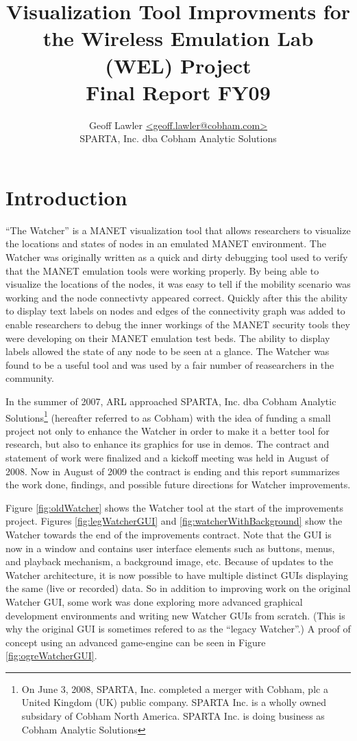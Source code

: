 \documentclass{report}
\author{Geoff Lawler \url{<geoff.lawler@cobham.com>} \\ SPARTA, Inc. dba Cobham Analytic Solutions}
\title{{\bf Visualization Tool Improvments for the Wireless Emulation Lab (WEL) Project}\\Final Report FY09}
\begin{document}
\maketitle

\renewcommand*\thesection{\arabic{section}}

\section{Introduction}

``The Watcher'' is a MANET visualization tool that allows researchers to visualize the locations and states of nodes in an emulated MANET environment. The Watcher was originally written 
as a quick and dirty debugging tool used to verify that the MANET emulation tools were working properly. By being able to visualize the locations of the nodes, it was easy to 
tell if the mobility scenario was working and the node connectivty appeared correct. Quickly after this the ability to display text labels on nodes and edges of the connectivity 
graph was added to enable researchers to debug the inner workings of the MANET security tools they were developing on their MANET emulation test beds. The ability to display labels
allowed the state of any node to be seen at a glance. The Watcher was found to be a useful tool and was used by a fair number of reasearchers in the community. 

In the summer of 2007, ARL approached SPARTA, Inc. dba Cobham Analytic Solutions\footnote{On June 3, 2008, SPARTA, Inc. completed a merger with Cobham, plc a United Kingdom (UK) 
public company. SPARTA Inc. is a wholly owned subsidary of Cobham North America. SPARTA Inc. is doing business as Cobham Analytic Solutions}
(hereafter referred to as Cobham) with the idea of funding a small project not only to enhance the Watcher in order to make it a better tool for research, but also to enhance 
its graphics for use in demos. The contract and statement of work were finalized and a kickoff meeting was held in August of 2008. Now in August of 2009 the contract is ending and 
this report summarizes the work done, findings, and possible future directions for Watcher improvements. 

Figure \ref{fig:oldWatcher} shows the Watcher tool at the start of the improvements project. Figures \ref{fig:legWatcherGUI} and \ref{fig:watcherWithBackground}
show the Watcher towards the end of the improvements contract. Note that the GUI is now in a window and contains user interface elements such as buttons, menus, and playback
mechanism, a background image, etc. Because of updates to the Watcher architecture, it is now possible to have multiple distinct GUIs displaying the same (live or recorded) data. So in addition to improving
work on the original Watcher GUI, some work was done exploring more advanced graphical development environments and writing new Watcher GUIs from scratch. (This is why the original
GUI is sometimes refered to as the ``legacy Watcher''.) A proof of concept using an advanced game-engine can be seen in Figure \ref{fig:ogreWatcherGUI}. 
\end{document}
